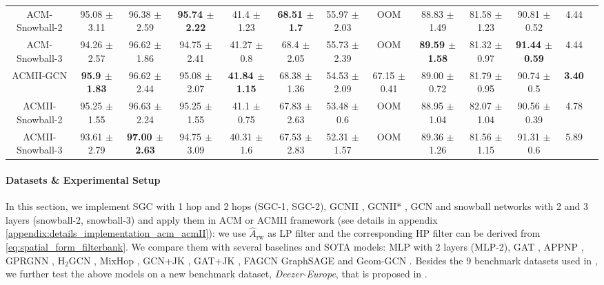 \documentclass{article}
\newcommand{\0}{{\boldsymbol{0}}}
\newcommand{\6}{{\partial}}
\newcommand{\8}{{\infty}}
\newcommand{\4}{{\nabla}}
\begin{document}
\begin{table}[htbp]
\begin{tabular}{c|cccccccccc|cc}
    ACM-Snowball-2 & 95.08 $\pm$ 3.11 & 96.38 $\pm$ 2.59 & \cellcolor[rgb]{ .816,  .808,  .808}\textbf{95.74 $\pm$ 2.22} & 41.4 $\pm$ 1.23 & \cellcolor[rgb]{ .816,  .808,  .808}\textbf{68.51 $\pm$ 1.7} & 55.97 $\pm$ 2.03 & OOM   & 88.83 $\pm$ 1.49 & 81.58 $\pm$ 1.23 & 90.81 $\pm$ 0.52 & 4.44 \\
    ACM-Snowball-3 & 94.26 $\pm$ 2.57 & 96.62 $\pm$ 1.86 & 94.75 $\pm$ 2.41 & 41.27 $\pm$ 0.8 & 68.4 $\pm$ 2.05 & 55.73 $\pm$ 2.39 & OOM   & \cellcolor[rgb]{ .816,  .808,  .808}\textbf{89.59 $\pm$ 1.58} & 81.32 $\pm$ 0.97 & \cellcolor[rgb]{ .816,  .808,  .808}\textbf{91.44 $\pm$ 0.59} & 4.44 \\
    \midrule
    ACMII-GCN & \cellcolor[rgb]{ .816,  .808,  .808}\textbf{95.9 $\pm$ 1.83} & 96.62 $\pm$ 2.44 & 95.08 $\pm$ 2.07 & \cellcolor[rgb]{ .816,  .808,  .808}\textbf{41.84 $\pm$ 1.15} & 68.38 $\pm$ 1.36 & 54.53 $\pm$ 2.09 & 67.15 $\pm$ 0.41 & 89.00 $\pm$ 0.72 & 81.79 $\pm$ 0.95 & 90.74 $\pm$ 0.5 & \cellcolor[rgb]{ .816,  .808,  .808}\textbf{3.40} \\
    ACMII-Snowball-2 & 95.25 $\pm$ 1.55 & 96.63 $\pm$ 2.24 & 95.25 $\pm$ 1.55 & 41.1 $\pm$ 0.75 & 67.83 $\pm$ 2.63 & 53.48 $\pm$ 0.6 & OOM   & 88.95 $\pm$ 1.04 & 82.07 $\pm$ 1.04 & 90.56 $\pm$ 0.39 & 4.78 \\
    ACMII-Snowball-3 & 93.61 $\pm$ 2.79 & \cellcolor[rgb]{ .816,  .808,  .808}\textbf{97.00 $\pm$ 2.63} & 94.75 $\pm$ 3.09 & 40.31 $\pm$ 1.6 & 67.53 $\pm$ 2.83 & 52.31 $\pm$ 1.57 & OOM   & 89.36 $\pm$ 1.26 & 81.56 $\pm$ 1.15 & 91.31 $\pm$ 0.6 & 5.89 \\
    \bottomrule
    \bottomrule
    \end{tabular}\label{tab:sota}\end{table} \paragraph{Datasets \& Experimental Setup}
In this section, we implement SGC \cite{wu2019simplifying} with 1 hop and 2 hops (SGC-1, SGC-2), GCNII \cite{chen2020simple}, GCNII* \cite{chen2020simple}, GCN \cite{kipf2016classification} and snowball networks with 2 and 3 layers (snowball-2, snowball-3) and apply them in ACM or ACMII framework (see details in appendix \ref{appendix:details_implementation_acm_acmII}): we use $\hat{A}_\text{rw}$ as LP filter and the corresponding HP filter can be derived from \eqref{eq:spatial_form_filterbank}. We compare them with several baselines and SOTA models: MLP with 2 layers (MLP-2), GAT \cite{velivckovic2017attention},  APPNP \cite{klicpera2018predict}, GPRGNN \cite{chien2021adaptive}, H$_2$GCN \cite{zhu2020beyond}, MixHop \cite{abu2019mixhop}, GCN+JK \cite{kipf2016classification, pmlr-v80-xu18c, lim2021new}, GAT+JK \cite{velivckovic2017attention, pmlr-v80-xu18c, lim2021new}, FAGCN \cite{bo2021beyond} GraphSAGE \cite{hamilton2017inductive} and Geom-GCN \cite{pei2020geom}. Besides the 9 benchmark datasets used in \cite{pei2020geom}, we further test the above models on a new benchmark dataset, \textit{Deezer-Europe}, that is proposed in \cite{lim2021new}.
\end{document}
